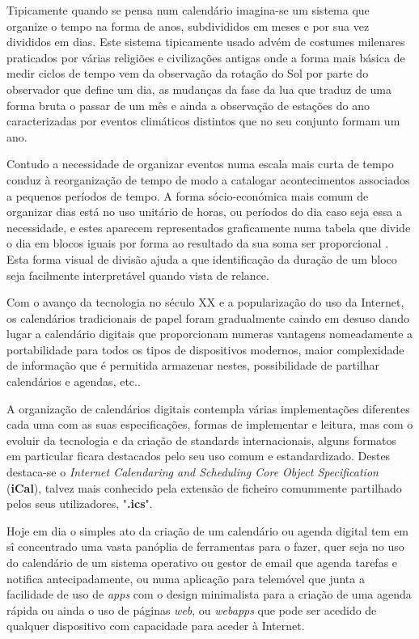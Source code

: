 \documentclass[11pt, twoside]{report}
\begin{document}
	Tipicamente quando se pensa num calendário imagina-se um sistema que organize o tempo na forma de anos, subdivididos em meses e por sua vez divididos em dias.
	Este sistema tipicamente usado advém de costumes milenares praticados por várias religiões e civilizações antigas onde a forma mais básica de medir ciclos de tempo vem da observação da rotação do Sol por parte do observador que define um dia, as mudanças da fase da lua que traduz de uma forma bruta o passar de um mês e ainda a observação de estações do ano caracterizadas por eventos climáticos distintos que no seu conjunto formam um ano\cite{stray_mayan_2007}.
	
	Contudo a necessidade de organizar eventos numa escala mais curta de tempo conduz à reorganização de tempo de modo a catalogar acontecimentos associados a pequenos períodos de tempo. 
	A forma sócio-económica mais comum de organizar dias está no uso unitário de horas, ou períodos do dia caso seja essa a necessidade, e estes aparecem representados graficamente numa tabela\cite{10.1145/2702613.2732512} que divide o dia em blocos iguais por forma ao resultado da sua soma ser proporcional \cite{Russell1910-RUSPMV}. 
	Esta forma visual de divisão ajuda a que identificação da duração de um bloco seja facilmente interpretável quando vista de relance. 
	
	Com o avanço da tecnologia no século XX e a popularização do uso da Internet, os calendários tradicionais de papel foram gradualmente caindo em desuso dando lugar a calendário digitais que proporcionam numeras vantagens nomeadamente a portabilidade para todos os tipos de dispositivos modernos, maior complexidade de informação que é permitida armazenar nestes, possibilidade de partilhar calendários e agendas, etc.. 
	
	A organização de calendários digitais contempla várias implementações diferentes cada uma com as suas especificações, formas de implementar e leitura, mas com o evoluir da tecnologia e da criação de standards internacionais, alguns formatos em particular ficara destacados pelo seu uso comum e estandardizado. 
	Destes destaca-se o \textit{Internet Calendaring and Scheduling Core Object Specification} (\textbf{iCal})\cite{rfc2445}, talvez mais conhecido pela extensão de ficheiro comummente partilhado pelos seus utilizadores, "\textbf{.ics}". 
	
	Hoje em dia o simples ato da criação de um calendário ou agenda digital tem em sî concentrado uma vasta panóplia de ferramentas para o fazer, quer seja no uso do calendário de um sistema operativo ou gestor de email que agenda tarefas e notifica antecipadamente, ou numa aplicação para telemóvel que junta a facilidade de uso de \textit{apps} com o design minimalista para a criação de uma agenda rápida ou ainda o uso de páginas \textit{web}, ou \textit{webapps} que pode ser acedido de qualquer dispositivo com capacidade para aceder à Internet. 
	
\end{document}
